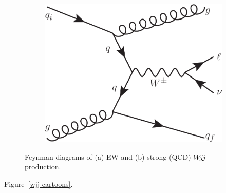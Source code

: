 \documentclass{PoS}
\def\wjj{\ensuremath{W\kern -0.2em j\kern -0.1emj}\xspace}
\begin{document}
\begin{figure}[t!]
\begin{subfigure}[t]{0.26\textwidth}
    \includegraphics[width=.99\textwidth]{STDM-2014-11/fig_02b.pdf}
    \caption{}
  \end{subfigure}
  \caption{Feynman diagrams of (a) EW and (b) strong (QCD) \wjj production.}
\end{figure}

Figure~\ref{wjj-cartoons}.
\end{document}
